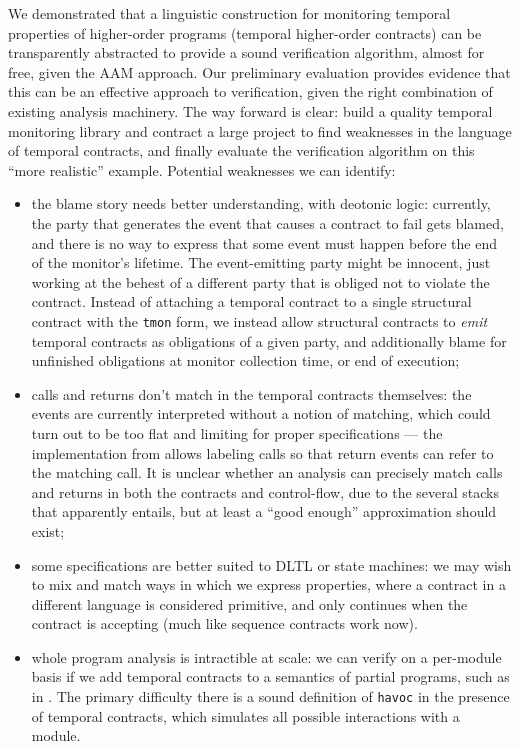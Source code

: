 We demonstrated that a linguistic construction for monitoring temporal properties of higher-order programs (temporal higher-order contracts) can be transparently abstracted to provide a sound verification algorithm, almost for free, given the AAM approach.
%
Our preliminary evaluation provides evidence that this can be an effective approach to verification, given the right combination of existing analysis machinery.
%
The way forward is clear: build a quality temporal monitoring library and contract a large project to find weaknesses in the language of temporal contracts, and finally evaluate the verification algorithm on this ``more realistic'' example.
%
Potential weaknesses we can identify:
\begin{itemize}
\item{the blame story needs better understanding, with deotonic logic:
%
currently, the party that generates the event that causes a contract to fail gets blamed, and there is no way to express that some event must happen before the end of the monitor's lifetime.
%
The event-emitting party might be innocent, just working at the behest of a different party that is obliged not to violate the contract.
%
Instead of attaching a temporal contract to a single structural contract with the {\tt tmon} form, we instead allow structural contracts to \emph{emit} temporal contracts as obligations of a given party, and additionally blame for unfinished obligations at monitor collection time, or end of execution;
}
%
\item{calls and returns don't match in the temporal contracts themselves:
%
the events are currently interpreted without a notion of matching, which could turn out to be too flat and limiting for proper specifications --- the implementation from \dfm allows labeling calls so that return events can refer to the matching call.
%
It is unclear whether an analysis can precisely match calls and returns in both the contracts and control-flow, due to the several stacks that apparently entails, but at least a ``good enough'' approximation should exist;
}
%
\item{some specifications are better suited to DLTL or state machines:
%
we may wish to mix and match ways in which we express properties, where a contract in a different language is considered primitive, and only continues when the contract is accepting (much like sequence contracts work now).
}
%
\item{whole program analysis is intractible at scale:
%
we can verify on a per-module basis if we add temporal contracts to a semantics of partial programs, such as in \citet{dvanhorn:TobinHochstadt2012Higherorder}.
%
The primary difficulty there is a sound definition of {\tt havoc} in the presence of temporal contracts, which simulates all possible interactions with a module.
}
\end{itemize}
%

%
